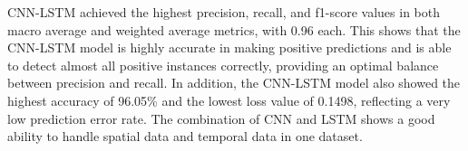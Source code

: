 
CNN-LSTM achieved the highest precision, recall, and f1-score values in both macro average and weighted average metrics, with 0.96 each. This shows that the CNN-LSTM model is highly accurate in making positive predictions and is able to detect almost all positive instances correctly, providing an optimal balance between precision and recall. In addition, the CNN-LSTM model also showed the highest accuracy of 96.05\% and the lowest loss value of 0.1498, reflecting a very low prediction error rate. The combination of CNN and LSTM shows a good ability to handle spatial data and temporal data in one dataset.

